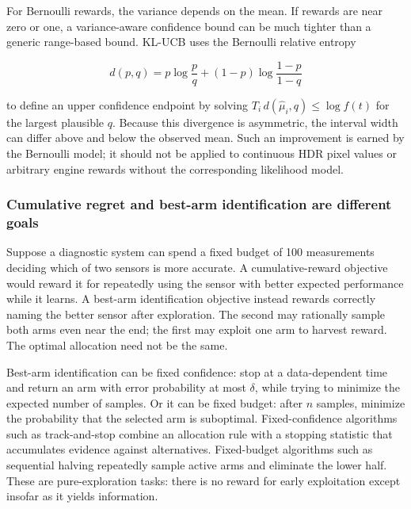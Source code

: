 For Bernoulli rewards, the variance depends on the mean. If rewards are near zero or one, a variance-aware confidence bound can be much tighter than a generic range-based bound. KL-UCB uses the Bernoulli relative entropy

\[
d(p,q)=p\log\frac pq+(1-p)\log\frac{1-p}{1-q}
\]

to define an upper confidence endpoint by solving \(T_i\,d(\hat\mu_i,q)\le\log f(t)\) for the largest plausible \(q\). Because this divergence is asymmetric, the interval width can differ above and below the observed mean. Such an improvement is earned by the Bernoulli model; it should not be applied to continuous HDR pixel values or arbitrary engine rewards without the corresponding likelihood model.

\subsubsection{Cumulative regret and best-arm identification are different goals}\label{02-foundations-ii-ch029-cumulative-regret-and-best-arm-identification-are-different-goals}

\hypertarget{02-foundations-ii-ch029-cumulative-regret-and-best-arm-identification-are-different-goals}{}

Suppose a diagnostic system can spend a fixed budget of 100 measurements deciding which of two sensors is more accurate. A cumulative-reward objective would reward it for repeatedly using the sensor with better expected performance while it learns. A best-arm identification objective instead rewards correctly naming the better sensor after exploration. The second may rationally sample both arms even near the end; the first may exploit one arm to harvest reward. The optimal allocation need not be the same.

Best-arm identification can be fixed confidence: stop at a data-dependent time and return an arm with error probability at most \(\delta\), while trying to minimize the expected number of samples. Or it can be fixed budget: after \(n\) samples, minimize the probability that the selected arm is suboptimal. Fixed-confidence algorithms such as track-and-stop combine an allocation rule with a stopping statistic that accumulates evidence against alternatives. Fixed-budget algorithms such as sequential halving repeatedly sample active arms and eliminate the lower half. These are pure-exploration tasks: there is no reward for early exploitation except insofar as it yields information.

